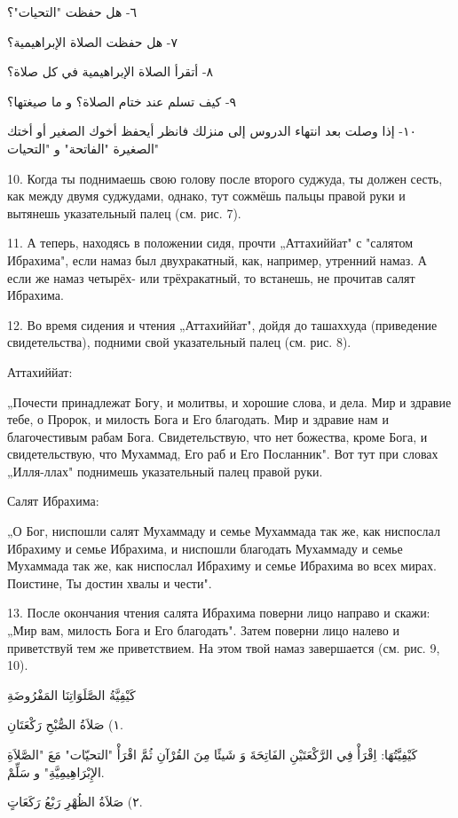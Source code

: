 \documentclass[a5paper]{article}
\begin{document}
٦- هل حفظت "التحيات"؟

٧- هل حفظت الصلاة الإبراهيمية؟

٨- أتقرأ الصلاة الإبراهيمية في كل صلاة؟

٩- كيف تسلم عند ختام الصلاة؟ و ما صيغتها؟

١٠- إذا وصلت بعد انتهاء الدروس إلى منزلك فانظر أيحفظ أخوك الصغير أو أختك الصغيرة "الفاتحة" و "التحيات"

10. Когда ты поднимаешь свою голову после второго суджуда, ты должен сесть, как между двумя суджудами, однако, тут сожмёшь пальцы правой руки и вытянешь указательный палец (см. рис. 7).

11. А теперь, находясь в положении сидя, прочти „Аттахиййат" с "салятом Ибрахима", если намаз был двухракатный, как, например, утренний намаз. А если же намаз четырёх- или трёхракатный, то встанешь, не прочитав салят Ибрахима.

12. Во время сидения и чтения „Аттахиййат", дойдя до ташаххуда (приведение свидетельства), подними свой указательный палец (см. рис. 8).

Аттахиййат:

„Почести принадлежат Богу, и молитвы, и хорошие слова, и дела. Мир и здравие тебе, о Пророк, и милость Бога и Его благодать. Мир и здравие нам и благочестивым рабам Бога. Свидетельствую, что нет божества, кроме Бога, и свидетельствую, что Мухаммад, Его раб и Его Посланник". Вот тут при словах „Илля-ллах" поднимешь указательный палец правой руки.

Салят Ибрахима:

„О Бог, ниспошли салят Мухаммаду и семье Мухаммада так же, как ниспослал Ибрахиму и семье Ибрахима, и ниспошли благодать Мухаммаду и семье Мухаммада так же, как ниспослал Ибрахиму и семье Ибрахима во всех мирах. Поистине, Ты достин хвалы и чести".

13. После окончания чтения салята Ибрахима поверни лицо направо и скажи: „Мир вам, милость Бога и Его благодать". Затем поверни лицо налево и приветствуй тем же приветствием. На этом твой намаз завершается (см. рис. 9, 10).

كَيْفِيَّةُ الصَّلَوَاتِنَا المَفْرُوضَةِ

١) صَلاَةُ الصُّبْحِ رَكْعَتَانِ.

كَيْفِيَّتُهَا: اِقْرَأْ فِي الرَّكْعَتَيْنِ الفَاتِحَةَ وَ شَيئًا مِنَ القُرْآنِ ثُمَّ اقْرَأْ "التحيّات" مَعَ "الصَّلاَةِ الإِبْرَاهِيمِيَّةِ" و سَلِّمْ.

٢) صَلاَةُ الظُهْرِ رَبْعُ رَكَعَاتٍ.
\end{document}
